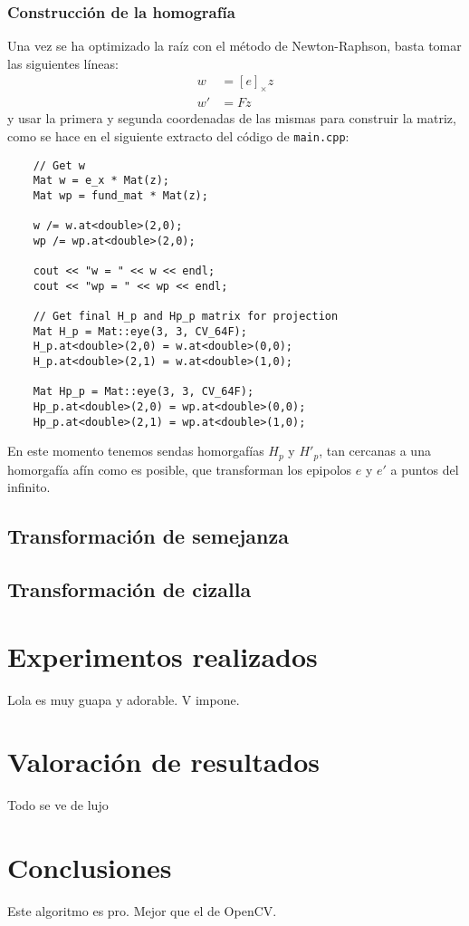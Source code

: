 \documentclass[a4paper, 11pt]{article}
\theoremstyle{definition}
\begin{document}
    \subsubsection{Construcción de la homografía}
    Una vez se ha optimizado la raíz con el método de Newton-Raphson, basta tomar las siguientes líneas:
    \begin{align*}
        w &= [e]_\times z \\
        w' &= F z
    \end{align*}
    y usar la primera y segunda coordenadas de las mismas para construir la matriz, como se hace en el siguiente extracto del código de \lstinline{main.cpp}:
    \begin{lstlisting}
    // Get w
    Mat w = e_x * Mat(z);
    Mat wp = fund_mat * Mat(z);

    w /= w.at<double>(2,0);
    wp /= wp.at<double>(2,0);

    cout << "w = " << w << endl;
    cout << "wp = " << wp << endl;

    // Get final H_p and Hp_p matrix for projection
    Mat H_p = Mat::eye(3, 3, CV_64F);
    H_p.at<double>(2,0) = w.at<double>(0,0);
    H_p.at<double>(2,1) = w.at<double>(1,0);

    Mat Hp_p = Mat::eye(3, 3, CV_64F);
    Hp_p.at<double>(2,0) = wp.at<double>(0,0);
    Hp_p.at<double>(2,1) = wp.at<double>(1,0);
    \end{lstlisting}

    En este momento tenemos sendas homorgafías $H_p$ y $H'_p$, tan cercanas a una homorgafía afín como es posible, que transforman los epipolos $e$ y $e'$ a puntos del infinito.

    \subsection{Transformación de semejanza}

    \subsection{Transformación de cizalla}

    \section{Experimentos realizados}

    Lola es muy guapa y adorable. V impone.

    \section{Valoración de resultados}

    Todo se ve de lujo

    \section{Conclusiones}

    Este algoritmo es pro. Mejor que el de OpenCV.



    
    
\end{document}

